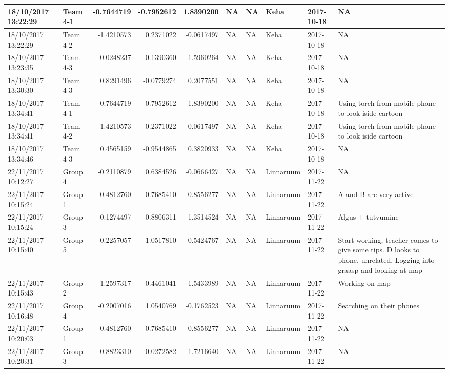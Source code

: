 \documentclass[]{article}
\begin{document}
\begin{tabular}{l|l|r|r|r|l|l|l|l|l}
\hline
18/10/2017 13:22:29 & Team 4-1 & -0.7644719 & -0.7952612 & 1.8390200 & NA & NA & Keha & 2017-10-18 & NA\\
\hline
18/10/2017 13:22:29 & Team 4-2 & -1.4210573 & 0.2371022 & -0.0617497 & NA & NA & Keha & 2017-10-18 & NA\\
\hline
18/10/2017 13:23:35 & Team 4-3 & -0.0248237 & 0.1390360 & 1.5960264 & NA & NA & Keha & 2017-10-18 & NA\\
\hline
18/10/2017 13:30:30 & Team 4-3 & 0.8291496 & -0.0779274 & 0.2077551 & NA & NA & Keha & 2017-10-18 & NA\\
\hline
18/10/2017 13:34:41 & Team 4-1 & -0.7644719 & -0.7952612 & 1.8390200 & NA & NA & Keha & 2017-10-18 & Using torch from mobile phone to look iside cartoon\\
\hline
18/10/2017 13:34:41 & Team 4-2 & -1.4210573 & 0.2371022 & -0.0617497 & NA & NA & Keha & 2017-10-18 & Using torch from mobile phone to look iside cartoon\\
\hline
18/10/2017 13:34:46 & Team 4-3 & 0.4565159 & -0.9544865 & 0.3820933 & NA & NA & Keha & 2017-10-18 & NA\\
\hline
22/11/2017 10:12:27 & Group 4 & -0.2110879 & 0.6384526 & -0.0666427 & NA & NA & Linnaruum & 2017-11-22 & NA\\
\hline
22/11/2017 10:15:24 & Group 1 & 0.4812760 & -0.7685410 & -0.8556277 & NA & NA & Linnaruum & 2017-11-22 & A and B are very active\\
\hline
22/11/2017 10:15:24 & Group 3 & -0.1274497 & 0.8806311 & -1.3514524 & NA & NA & Linnaruum & 2017-11-22 & Algus + tutvumine\\
\hline
22/11/2017 10:15:40 & Group 5 & -0.2257057 & -1.0517810 & 0.5424767 & NA & NA & Linnaruum & 2017-11-22 & Start working, teacher comes to give some tips. D looks to phone, unrelated. Logging into graasp and looking at map\\
\hline
22/11/2017 10:15:43 & Group 2 & -1.2597317 & -0.4461041 & -1.5433989 & NA & NA & Linnaruum & 2017-11-22 & Working on map\\
\hline
22/11/2017 10:16:48 & Group 4 & -0.2007016 & 1.0540769 & -0.1762523 & NA & NA & Linnaruum & 2017-11-22 & Searching on their phones\\
\hline
22/11/2017 10:20:03 & Group 1 & 0.4812760 & -0.7685410 & -0.8556277 & NA & NA & Linnaruum & 2017-11-22 & NA\\
\hline
22/11/2017 10:20:31 & Group 3 & -0.8823310 & 0.0272582 & -1.7216640 & NA & NA & Linnaruum & 2017-11-22 & NA\\

\end{tabular}
\end{document}
